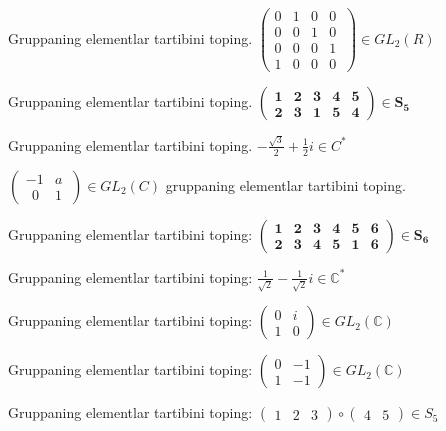 Gruppaning elementlar tartibini toping. \(\left( \begin{matrix}
0 & 1 & 0 & 0 \\
0 & 0 & 1 & 0 \\
0 & 0 & 0 & 1 \\
1 & 0 & 0 & 0
\end{matrix}\  \right) \in GL_{2}(R)\)

Gruppaning elementlar tartibini toping. \(\begin{pmatrix}
\mathbf{1} & \mathbf{2} & \mathbf{3} & \mathbf{4} & \mathbf{5} \\
\mathbf{2} & \mathbf{3} & \mathbf{1} & \mathbf{5} & \mathbf{4}
\end{pmatrix}\mathbf{\in}\mathbf{S}_{\mathbf{5}}\)

Gruppaning elementlar tartibini toping. \(- \frac{\sqrt{3}}{2} + \frac{1}{2}i \in C^{*}\)

\(\left( \begin{matrix}
 - 1 & a \\
\ \ 0 & 1
\end{matrix}\  \right) \in GL_{2}(C)\) gruppaning elementlar tartibini toping.

Gruppaning elementlar tartibini toping: \(\begin{pmatrix}
\mathbf{1} & \mathbf{2} & \mathbf{3} & \mathbf{4} & \mathbf{5} & \mathbf{6} \\
\mathbf{2} & \mathbf{3} & \mathbf{4} & \mathbf{5} & \mathbf{1} & \mathbf{6}
\end{pmatrix}\mathbf{\in}\mathbf{S}_{\mathbf{6}}\)

Gruppaning elementlar tartibini toping: \(\frac{1}{\sqrt{2}} - \frac{1}{\sqrt{2}}i \in \mathbb{C}^{*}\)

Gruppaning elementlar tartibini toping: \(\begin{pmatrix}
0 & i \\
1 & 0
\end{pmatrix} \in GL_{2}(\mathbb{C})\)

Gruppaning elementlar tartibini toping: \(\begin{pmatrix}
0 & - 1 \\
1 & - 1
\end{pmatrix} \in GL_{2}(\mathbb{C})\)

Gruppaning elementlar tartibini toping: \(\begin{pmatrix}
1 & 2 & 3
\end{pmatrix} \circ \begin{pmatrix}
4 & 5
\end{pmatrix} \in S_{5}\)

